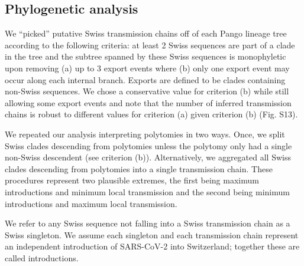 \documentclass[9pt,twocolumn,twoside,lineno]{pnas-new}
\begin{document}
{\subsection*{Phylogenetic analysis}
We ``picked'' putative Swiss transmission chains off of each Pango lineage tree according to the following criteria: at least 2 Swiss sequences are part of a clade in the tree and the subtree spanned by these Swiss sequences is monophyletic upon removing (a) up to 3 export events where (b) only one export event may occur along each internal branch. Exports are defined to be clades containing non-Swiss sequences. We chose a conservative value for criterion (b) while still allowing some export events and note that the number of inferred transmission chains is robust to different values for criterion (a) given criterion (b) (Fig. S13).

We repeated our analysis interpreting polytomies in two ways. Once, we split Swiss clades descending from polytomies unless the polytomy only had a single non-Swiss descendent (see criterion (b)). Alternatively, we aggregated all Swiss clades descending from polytomies into a single transmission chain. These procedures represent two plausible extremes, the first being maximum introductions and minimum local transmission and the second being minimum introductions and maximum local transmission.

We refer to any Swiss sequence not falling into a Swiss transmission chain as a Swiss singleton. We assume each singleton and each transmission chain represent an independent introduction of SARS-CoV-2 into Switzerland; together these are called introductions.


}
\end{document}
